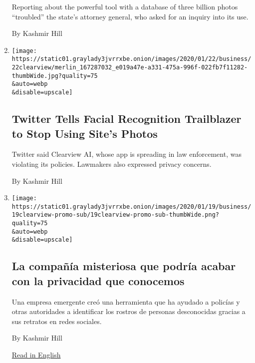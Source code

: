 \begin{enumerate}
  Reporting about the powerful tool with a database of three billion
  photos ``troubled'' the state's attorney general, who asked for an
  inquiry into its use.

  By Kashmir Hill
\item
  \href{/2020/01/22/technology/clearview-ai-twitter-letter.html}{}

  \texttt{[image: https://static01.graylady3jvrrxbe.onion/images/2020/01/22/business/22clearview/merlin\_167287032\_e019a47e-a331-475a-996f-022fb7f11282-thumbWide.jpg?quality=75\\\&auto=webp\\\&disable=upscale]}

  \hypertarget{twitter-tells-facial-recognition-trailblazer-to-stop-using-sites-photos}{%
  \subsection{Twitter Tells Facial Recognition Trailblazer to Stop Using
  Site's
  Photos}\label{twitter-tells-facial-recognition-trailblazer-to-stop-using-sites-photos}}

  Twitter said Clearview AI, whose app is spreading in law enforcement,
  was violating its policies. Lawmakers also expressed privacy concerns.

  By Kashmir Hill
\item
  \href{/es/2020/01/20/espanol/negocios/clearview-reconocimiento-facial.html}{}

  \texttt{[image: https://static01.graylady3jvrrxbe.onion/images/2020/01/19/business/19clearview-promo-sub/19clearview-promo-sub-thumbWide.png?quality=75\\\&auto=webp\\\&disable=upscale]}

  \hypertarget{la-compauxf1uxeda-misteriosa-que-podruxeda-acabar-con-la-privacidad-que-conocemos}{%
  \subsection{La compañía misteriosa que podría acabar con la privacidad
  que
  conocemos}\label{la-compauxf1uxeda-misteriosa-que-podruxeda-acabar-con-la-privacidad-que-conocemos}}

  Una empresa emergente creó una herramienta que ha ayudado a policías y
  otras autoridades a identificar los rostros de personas desconocidas
  gracias a sus retratos en redes sociales.

  By Kashmir Hill

  \href{https://www.nytimes3xbfgragh.onion/2020/01/18/technology/clearview-privacy-facial-recognition.html}{Read
  in English}
\end{enumerate}

